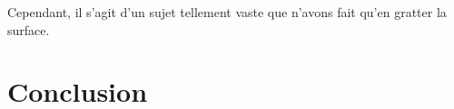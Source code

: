 \documentclass[a4paper, 12pt]{article} %
\begin{document}
Cependant, il s'agit d'un sujet tellement vaste que n'avons fait qu'en gratter la surface.


\newpage
\section{Conclusion}



\newpage



\end{document}
